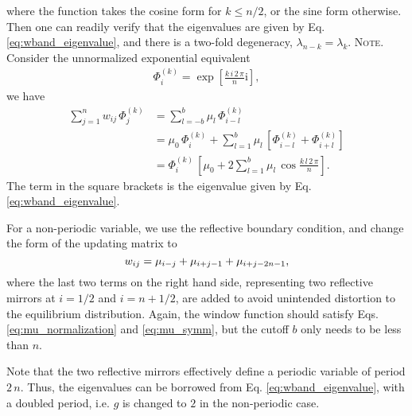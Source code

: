 \documentclass[preprint, superscriptaddress, floatfix]{revtex4-1}
\newcommand{\note}[1]{{\color{DarkGreen}\footnotesize \textsc{Note.} #1}}
\newcommand{\ii}{\mathrm{i}}
\begin{document}
%
where the function takes the cosine form for $k \le n/2$,
or the sine form otherwise.
%
Then one can readily verify that the eigenvalues are given by
  Eq. \eqref{eq:wband_eigenvalue},
  and there is a two-fold degeneracy,
  $\lambda_{n - k} = \lambda_k$.
\note{Consider the unnormalized exponential equivalent
  \begin{align*}
  \Phi^{(k)}_i =
  \exp\left[
    \frac{ k \, i \, 2 \, \pi }
         {      n             }
    \ii
  \right]
  ,
  \end{align*}
  we have
  \begin{align*}
  \sum_{j = 1}^n
    w_{ij} \, \Phi^{(k)}_j
  &=
  \sum_{l = -b}^b
    \mu_l \, \Phi^{(k)}_{i - l}
  \\
  &=
  \mu_0 \, \Phi^{(k)}_i
  +
  \sum_{l = 1}^b
    \mu_l \,
    \left[ \Phi^{(k)}_{i - l} + \Phi^{(k)}_{i + l} \right]
  \\
  &=
  \Phi^{(k)}_i \,
  \left[
    \mu_0
    +
    2 \sum_{l = 1}^b
      \mu_l \, \cos
      \frac{ k \, l \, 2 \, \pi }
           {      n             }
  \right]
  .
  \end{align*}
  The term in the square brackets is the eigenvalue given by
  Eq. \eqref{eq:wband_eigenvalue}.
}
%


For a non-periodic variable,
we use the reflective boundary condition\cite{bussi2006},
and change the form of the updating matrix to
%
%
\begin{equation}
  w_{ij}
  =
  \mu_{ i - j }
  +
  \mu_{ i + j - 1 }
  +
  \mu_{ i + j - 2 n - 1 }
  ,
  \notag
  \label{eq:w_band_refl}
\end{equation}
%
where the last two terms on the right hand side,
representing two reflective mirrors at
$i = 1/2$ and $i = n + 1/2$,
are added to avoid unintended distortion\cite{dickson2011, mcgovern2013}
to the equilibrium distribution\cite{bussi2006}.
%
Again, the window function should satisfy
Eqs. \eqref{eq:mu_normalization}
and \eqref{eq:mu_symm},
but
the cutoff $b$ only needs to be less than $n$.

Note that the two reflective mirrors effectively
define a periodic variable of period $2 \, n$.
Thus, the eigenvalues can be borrowed from
Eq. \eqref{eq:wband_eigenvalue},
with a doubled period,
i.e. $g$ is changed to $2$ in the non-periodic case.
\end{document}
